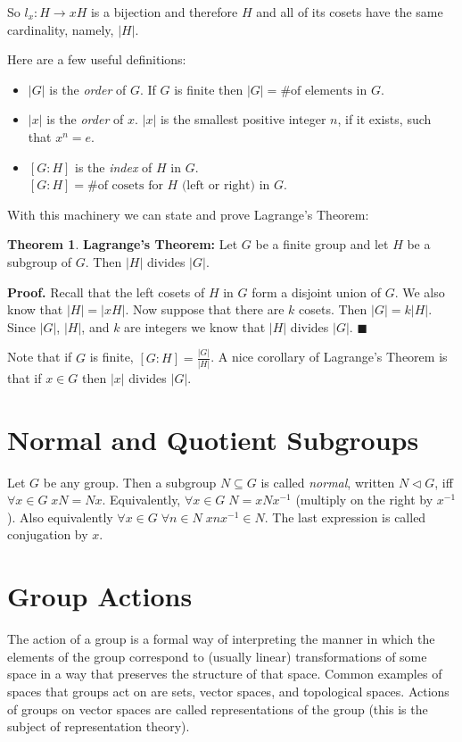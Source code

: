 \documentclass{article}
\theoremstyle{definition}
\newtheorem{theorem}{Theorem}[section]
\begin{document}
\medskip
\noindent
So $l_x: H \rightarrow xH$ is a bijection and therefore $H$ and
all of its cosets have the same cardinality, namely, $|H|$. 


\bigskip
\noindent
Here are a few useful definitions:

\medskip
\begin{itemize}
\item $| G |$ is the \emph{order} of $G$. If $G$ is finite then
      $|G| = \text{\# of elements in } G$. 
\item $| x |$ is the \emph{order} of $x$.  $|x|$ is the smallest
      positive integer $n$, if it exists, such that $x^n = e$. 
\item $[G:H]$ is the \emph{index} of $H$ in $G$. $[G:H] =
      \text{\# of cosets for $H$ (left or right) in $G$}$. 
\end{itemize}

\medskip
\noindent
With this machinery we can state and prove Lagrange's Theorem:

\noindent
\begin{theorem}
\textbf{Lagrange's Theorem:}  Let  $G$ be a finite group and let
$H$ be a subgroup of $G$. Then $|H|$ divides $|G|$.  
\label{thm:lagrange}
\end{theorem}

\bigskip
\noindent
\textbf{Proof.} Recall that the left cosets of $H$ in $G$ form a
disjoint union of $G$. We also know that $|H| = |xH|$. Now suppose
that there are $k$ cosets.  Then $|G| = k |H|$. Since
$|G|$, $|H|$, and $k$ are integers we know that $|H|$ divides $|G|$. 
$\blacksquare$

\bigskip
\noindent
Note that if $G$ is finite, $[G:H] = \frac{|G|}{|H|}$. A nice
corollary of Lagrange's Theorem is that if $x \in G$ then $|x|$
divides $|G|$.

\section{Normal and Quotient Subgroups}
Let $G$ be any group. Then a subgroup $N \subseteq G$ is called
\emph{normal}, written $N \lhd G$, iff $\forall x \in G \; xN =
Nx$. Equivalently, $\forall x \in G \; N = xNx^{-1}$ (multiply on
the right by $x^{-1}$). Also equivalently $\forall x \in G \;
\forall n \in N \; x n x^{-1} \in N$. The last expression is
called conjugation by $x$.


\section{Group Actions}
The action of a group is a formal way of interpreting the manner
in which the elements of the group correspond to (usually linear)
transformations of some space in a way that preserves the
structure of that space. Common examples of spaces that groups
act on are sets, vector spaces, and topological spaces.  Actions
of groups on vector spaces are called representations of the
group (this is the subject of representation theory).
\end{document}
